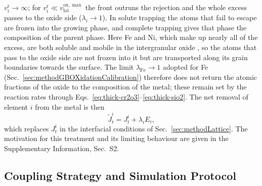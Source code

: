 \documentclass[3p,times]{elsarticle} %
\newcommand{\lat}{\mathrm{lat}}
\newcommand{\ox}{\mathrm{ox}}
\begin{document}
\(v_i^{\mathrm{r}}\to\infty\); for \(v_i^{\mathrm{r}}\ll v_{\lat}^{\ox,\max}\)
the front outruns the rejection and the whole excess passes to the oxide side
(\(\lambda_i\to1\)). In solute trapping the atoms that fail to escape are
frozen into the growing phase, and complete trapping gives that phase the
composition of the parent phase. Here Fe and Ni, which make up nearly all of
the excess, are both soluble
and mobile in the intergranular oxide \cite{deng2020corrosion}, so the
atoms that pass to the oxide side are not frozen into it but are transported
along its grain boundaries towards the surface. The limit
\(\lambda_{\mathrm{Fe}}\to1\) adopted for Fe
(Sec.~\ref{sec:methodGBOXidationCalibration}) therefore does not return the
atomic fractions of the oxide to the composition of the metal; these remain
set by the reaction rates through
Eqs.~\eqref{eq:thick-cr2o3}--\eqref{eq:thick-sio2}. The net removal of element
\(i\) from the metal is then
\begin{equation}
\tilde{J}_{\mathrm{r}}^{i}=J_{\mathrm{r}}^{i}+\lambda_i E_i ,
\label{eq:sink-capture}
\end{equation}
which replaces \(J_{\mathrm{r}}^{i}\) in the interfacial conditions of
Sec.~\ref{sec:methodLattice}. The motivation for this treatment and its limiting
behaviour are given in the Supplementary Information, Sec.~S2.

\subsection{Coupling Strategy and Simulation Protocol}
\label{sec:methodCoupling}
\end{document}
